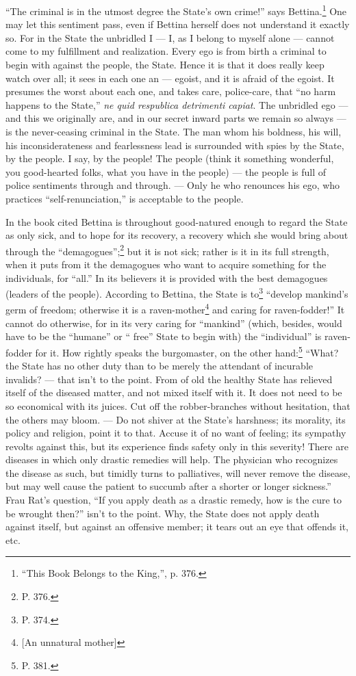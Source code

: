 ``The criminal is in the utmost degree the State's own crime!'' says 
Bettina.\footnote{``This Book Belongs to the King,'', p. 376.} One may let 
this sentiment pass, even if Bettina herself does not understand it exactly 
so. For in the State the unbridled I --- I, as I belong to myself alone --- cannot come to my fulfillment and realization. Every ego is from birth a 
criminal to begin with against the people, the State. Hence it is that it does 
really keep watch over all; it sees in each one an --- egoist, and it is afraid 
of the egoist. It presumes the worst about each one, and takes care, 
police-care, that ``no harm happens to the State,'' \textit{ne quid 
respublica detrimenti capiat}. The unbridled ego --- and this we originally 
are, and in our secret inward parts we remain so always --- is the 
never-ceasing criminal in the State. The man whom his boldness, his will, his 
inconsiderateness and fearlessness lead is surrounded with spies by the State, 
by the people. I say, by the people! The people (think it something wonderful, 
you good-hearted folks, what you have in the people) --- the people is full of 
police sentiments through and through. --- Only he who renounces his ego, who 
practices ``self-renunciation,'' is acceptable to the people.

In the book cited Bettina is throughout good-natured enough to regard the 
State as only sick, and to hope for its recovery, a recovery which she would 
bring about through the ``demagogues'';\footnote{P. 376.} but it is not 
sick; rather is it in its full strength, when it puts from it the demagogues 
who want to acquire something for the individuals, for ``all.'' In its 
believers it is provided with the best demagogues (leaders of the people). 
According to Bettina, the State is to\footnote{P. 374.} ``develop mankind's 
germ of freedom; otherwise it is a raven-mother\footnote{[An unnatural 
mother]} and caring for raven-fodder!'' It cannot do otherwise, for in its 
very caring for ``mankind'' (which, besides, would have to be the 
``humane'' or `` free'' State to begin with) the ``individual'' is 
raven-fodder for it. How rightly speaks the burgomaster, on the other 
hand:\footnote{P. 381.} ``What? the State has no other duty than to be merely 
the attendant of incurable invalids? --- that isn't to the point. From of old 
the healthy State has relieved itself of the diseased matter, and not mixed 
itself with it. It does not need to be so economical with its juices. Cut off 
the robber-branches without hesitation, that the others may bloom. --- Do not 
shiver at the State's harshness; its morality, its policy and religion, point 
it to that. Accuse it of no want of feeling; its sympathy revolts against 
this, but its experience finds safety only in this severity! There are 
diseases in which only drastic remedies will help. The physician who 
recognizes the disease as such, but timidly turns to palliatives, will never 
remove the disease, but may well cause the patient to succumb after a shorter 
or longer sickness.'' Frau Rat's question, ``If you apply death as a drastic 
remedy, how is the cure to be wrought then?'' isn't to the point. Why, the 
State does not apply death against itself, but against an offensive member; it 
tears out an eye that offends it, etc.

